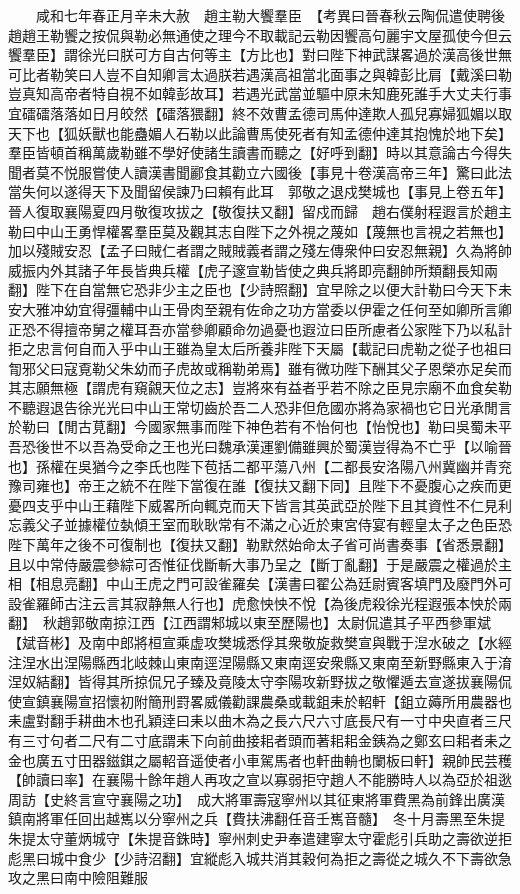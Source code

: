　　咸和七年春正月辛未大赦　趙主勒大饗羣臣　【考異曰晉春秋云陶侃遣使聘後趙趙王勒饗之按侃與勒必無通使之理今不取載記云勒因饗高句麗宇文屋孤使今但云饗羣臣】謂徐光曰朕可方自古何等主【方比也】對曰陛下神武謀畧過於漢高後世無可比者勒笑曰人豈不自知卿言太過朕若遇漢高祖當北面事之與韓彭比肩【戴溪曰勒豈真知高帝者特自視不如韓彭故耳】若遇光武當並驅中原未知鹿死誰手大丈夫行事宜礌礌落落如日月皎然【礌落猥翻】終不效曹孟德司馬仲達欺人孤兒寡婦狐媚以取天下也【狐妖獸也能蠱媚人石勒以此論曹馬使死者有知孟德仲達其抱愧於地下矣】羣臣皆頓首稱萬歲勒雖不學好使諸生讀書而聽之【好呼到翻】時以其意論古今得失聞者莫不悦服嘗使人讀漢書聞酈食其勸立六國後【事見十卷漢高帝三年】驚曰此法當失何以遂得天下及聞留侯諫乃曰賴有此耳　郭敬之退戍樊城也【事見上卷五年】晉人復取襄陽夏四月敬復攻拔之【敬復扶又翻】留戍而歸　趙右僕射程遐言於趙主勒曰中山王勇悍權畧羣臣莫及觀其志自陛下之外視之蔑如【蔑無也言視之若無也】加以殘賊安忍【孟子曰賊仁者謂之賊賊義者謂之殘左傳衆仲曰安忍無親】久為將帥威振内外其諸子年長皆典兵權【虎子邃宣勒皆使之典兵將即亮翻帥所類翻長知兩翻】陛下在自當無它恐非少主之臣也【少詩照翻】宜早除之以便大計勒曰今天下未安大雅冲幼宜得彊輔中山王骨肉至親有佐命之功方當委以伊霍之任何至如卿所言卿正恐不得擅帝舅之權耳吾亦當參卿顧命勿過憂也遐泣曰臣所慮者公家陛下乃以私計拒之忠言何自而入乎中山王雖為皇太后所養非陛下天屬【載記曰虎勒之從子也祖曰㔨邪父曰寇覔勒父朱幼而子虎故或稱勒弟焉】雖有微功陛下酬其父子恩榮亦足矣而其志願無極【謂虎有窺覦天位之志】豈將來有益者乎若不除之臣見宗廟不血食矣勒不聽遐退告徐光光曰中山王常切齒於吾二人恐非但危國亦將為家禍也它日光承閒言於勒曰【閒古莧翻】今國家無事而陛下神色若有不怡何也【怡悅也】勒曰吳蜀未平吾恐後世不以吾為受命之王也光曰魏承漢運劉備雖興於蜀漢豈得為不亡乎【以喻晉也】孫權在吳猶今之李氏也陛下苞括二都平蕩八州【二都長安洛陽八州冀幽并青兖豫司雍也】帝王之統不在陛下當復在誰【復扶又翻下同】且陛下不憂腹心之疾而更憂四支乎中山王藉陛下威畧所向輒克而天下皆言其英武亞於陛下且其資性不仁見利忘義父子並據權位埶傾王室而耿耿常有不滿之心近於東宮侍宴有輕皇太子之色臣恐陛下萬年之後不可復制也【復扶又翻】勒默然始命太子省可尚書奏事【省悉景翻】且以中常侍嚴震參綜可否惟征伐斷斬大事乃呈之【斷丁亂翻】于是嚴震之權過於主相【相息亮翻】中山王虎之門可設雀羅矣【漢書曰翟公為廷尉賓客填門及廢門外可設雀羅師古注云言其寂静無人行也】虎愈怏怏不悅【為後虎殺徐光程遐張本怏於兩翻】　秋趙郭敬南掠江西【江西謂邾城以東至歷陽也】太尉侃遣其子平西參軍斌【斌音彬】及南中郎將桓宣乘虚攻樊城悉俘其衆敬旋救樊宣與戰于湼水破之【水經注涅水出涅陽縣西北岐棘山東南逕涅陽縣又東南逕安衆縣又東南至新野縣東入于淯涅奴結翻】皆得其所掠侃兄子臻及竟陵太守李陽攻新野拔之敬懼遁去宣遂拔襄陽侃使宣鎮襄陽宣招懷初附簡刑罸畧威儀勸課農桑或載鉏耒於軺軒【鉏立薅所用農器也耒盧對翻手耕曲木也孔穎逹曰耒以曲木為之長六尺六寸底長尺有一寸中央直者三尺有三寸句者二尺有二寸底謂耒下向前曲接耜者頭而著耜耜金銕為之鄭玄曰耜者耒之金也廣五寸田器鎡錤之屬軺音遥使者小車駕馬者也軒曲輈也闌板曰軒】親帥民芸穫【帥讀曰率】在襄陽十餘年趙人再攻之宣以寡弱拒守趙人不能勝時人以為亞於祖逖周訪【史終言宣守襄陽之功】　成大將軍壽寇寧州以其征東將軍費黑為前鋒出廣漢鎮南將軍任回出越嶲以分寧州之兵【費扶沸翻任音壬嶲音髓】　冬十月壽黑至朱提朱提太守董炳城守【朱提音銖時】寧州刺史尹奉遣建寧太守霍彪引兵助之壽欲逆拒彪黑曰城中食少【少詩沼翻】宜縱彪入城共消其穀何為拒之壽從之城久不下壽欲急攻之黑曰南中險阻難服